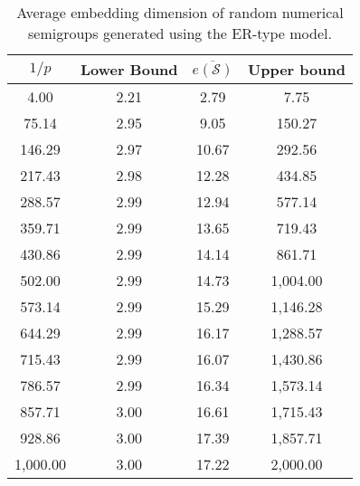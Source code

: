 \begin{table}
\centering
\begin{tabular}{|c|c|c|c|}
    \hline
    $1/p$ & Lower Bound & $\overline{e(\mathcal{S})}$  & Upper bound \\
    \hline
    4.00 & 2.21 & 2.79 & 7.75 \\
    75.14 & 2.95 & 9.05 & 150.27 \\
    146.29 & 2.97 & 10.67 & 292.56 \\
    217.43 & 2.98 & 12.28 & 434.85 \\
    288.57 & 2.99 & 12.94 & 577.14 \\
    359.71 & 2.99 & 13.65 & 719.43 \\
    430.86 & 2.99 & 14.14 & 861.71 \\
    502.00 & 2.99 & 14.73 & 1,004.00 \\
    573.14 & 2.99 & 15.29 & 1,146.28 \\
    644.29 & 2.99 & 16.17 & 1,288.57 \\
    715.43 & 2.99 & 16.07 & 1,430.86 \\
    786.57 & 2.99 & 16.34 & 1,573.14 \\
    857.71 & 3.00 & 16.61 & 1,715.43 \\
    928.86 & 3.00 & 17.39 & 1,857.71 \\
    1,000.00 & 3.00 & 17.22 & 2,000.00 \\
    \hline
\end{tabular}
\caption{Average embedding dimension of random numerical semigroups generated using the ER-type model.}
\label{tab:embedding}
\end{table}

